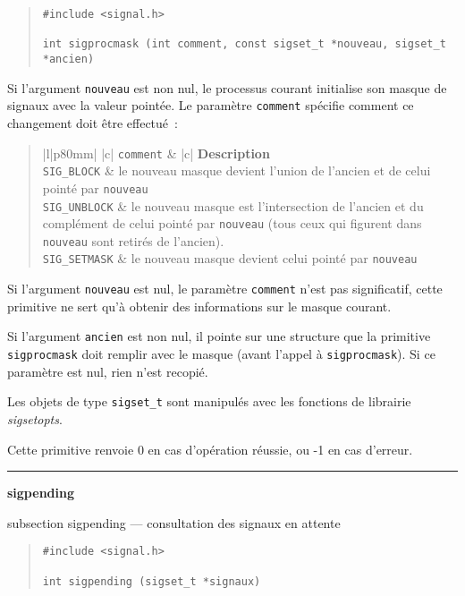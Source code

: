 \documentclass [twoside] {report}
\newcommand {\primitive} [1]
    {
	{\large \bf #1}
	\addcontentsline {toc} {subsection} {#1}
    }
\newcommand {\separation}
    {
	\vspace {7mm}
	\nopagebreak
	\hrule
    }
\begin{document}
\begin {quote}
\begin {verbatim}
#include <signal.h>

int sigprocmask (int comment, const sigset_t *nouveau, sigset_t *ancien)
\end{verbatim}
\end {quote}

Si l'argument {\tt nouveau} est non nul, le processus courant initialise
son masque de signaux avec la valeur pointée. Le paramètre {\tt comment}
spécifie comment ce changement doit être effectué~:

\begin {quote}
\begin {tabular} {|l|p{80mm}|} \hline
     {|c|} {\tt comment}
	&  {|c|} {\bf Description}
	\\ \hline
    \verb:SIG_BLOCK:
	& le nouveau masque devient l'union de l'ancien et de celui pointé
	    par {\tt nouveau}
	\\ \hline
    \verb:SIG_UNBLOCK:
	& le nouveau masque est l'intersection de l'ancien et du
	    complément de celui pointé par {\tt nouveau} (tous ceux qui
	    figurent dans {\tt nouveau} sont retirés de l'ancien).
	\\ \hline
    \verb:SIG_SETMASK:
	& le nouveau masque devient celui pointé par {\tt nouveau}
	\\ \hline
\end {tabular}
\end {quote}

Si l'argument {\tt nouveau} est nul, le paramètre {\tt comment}
n'est pas significatif, cette primitive ne sert qu'à obtenir des
informations sur le masque courant.

Si l'argument {\tt ancien} est non nul, il pointe sur une structure que
la primitive {\tt sigprocmask} doit remplir avec le masque (avant
l'appel à {\tt sigprocmask}).  Si ce paramètre est nul, rien n'est
recopié.

Les objets de type {\tt sigset\_t} sont manipulés avec les fonctions de
librairie {\em sigsetopts}.

Cette primitive renvoie 0 en cas d'opération réussie, ou -1 en cas
d'erreur.



\separation
\primitive {sigpending} --- consultation des signaux en attente

\begin {quote}
\begin {verbatim}
#include <signal.h>

int sigpending (sigset_t *signaux)
\end{verbatim}
\end {quote}
\end{document}
